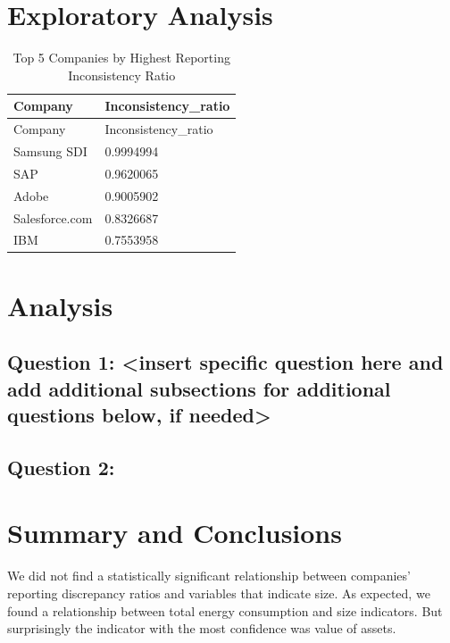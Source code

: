 \documentclass[
  12pt,
]{article}
\begin{document}
\hypertarget{exploratory-analysis}{%
\section{Exploratory Analysis}\label{exploratory-analysis}}

\begin{longtable}[]{@{}ll@{}}
\caption{Top 5 Companies by Highest Reporting Inconsistency
Ratio}\tabularnewline
\toprule
Company & Inconsistency\_ratio\tabularnewline
\midrule
\endfirsthead
\toprule
Company & Inconsistency\_ratio\tabularnewline
\midrule
\endhead
Samsung SDI & 0.9994994\tabularnewline
SAP & 0.9620065\tabularnewline
Adobe & 0.9005902\tabularnewline
Salesforce.com & 0.8326687\tabularnewline
IBM & 0.7553958\tabularnewline
\bottomrule
\end{longtable}

\newpage

\hypertarget{analysis}{%
\section{Analysis}\label{analysis}}

\hypertarget{question-1-insert-specific-question-here-and-add-additional-subsections-for-additional-questions-below-if-needed}{%
\subsection{Question 1: \textless insert specific question here and add
additional subsections for additional questions below, if
needed\textgreater{}}\label{question-1-insert-specific-question-here-and-add-additional-subsections-for-additional-questions-below-if-needed}}

\hypertarget{question-2}{%
\subsection{Question 2:}\label{question-2}}

\newpage

\hypertarget{summary-and-conclusions}{%
\section{Summary and Conclusions}\label{summary-and-conclusions}}

We did not find a statistically significant relationship between
companies' reporting discrepancy ratios and variables that indicate
size. As expected, we found a relationship between total energy
consumption and size indicators. But surprisingly the indicator with the
most confidence was value of assets.
\end{document}
